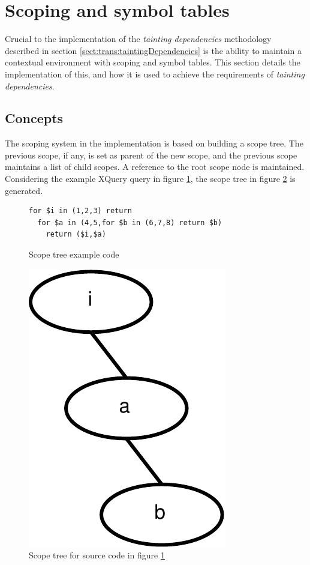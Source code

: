 \section{Scoping and symbol tables}
Crucial to the implementation of the \textit{tainting dependencies} methodology
described in section \ref{sect:trans:taintingDependencies} is the ability to
maintain a contextual environment with scoping and symbol tables. This section
details the implementation of this, and how it is used to achieve the
requirements of \textit{tainting dependencies}.

\subsection{Concepts}
The scoping system in the implementation is based on building a scope tree. The
previous scope, if any, is set as parent of the new scope, and the previous
scope maintains a list of child scopes. A reference to the root scope node is
maintained. Considering the example XQuery query in figure
\ref{fig:impl:scope_tree_ex_code}, the scope tree in figure
\ref{fig:impl:scope_tree_ex} is generated.

\begin{figure}[!htp]
\begin{center}
\begin{Verbatim}
for $i in (1,2,3) return 
  for $a in (4,5,for $b in (6,7,8) return $b) 
    return ($i,$a)
\end{Verbatim}
  \caption{Scope tree example code}
  \label{fig:impl:scope_tree_ex_code}
\end{center}
\end{figure}


\begin{figure}[!htp]
\begin{center}
  \includegraphics[scale=0.5]{diagrams/scope_tree_ex}
  \caption{Scope tree for source code in figure
  \ref{fig:impl:scope_tree_ex_code}}
  \label{fig:impl:scope_tree_ex}
\end{center}
\end{figure}

